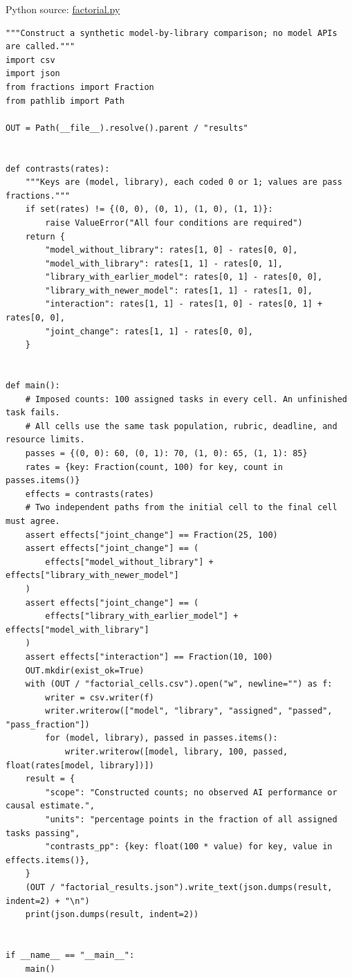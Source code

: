 \FloatBarrier
{}
Python source:
\href{../03_Data_and_Code/AI_Workflows/factorial.py}{factorial.py}

\begin{Verbatim}[breaklines,breakanywhere,fontsize=\small]
"""Construct a synthetic model-by-library comparison; no model APIs are called."""
import csv
import json
from fractions import Fraction
from pathlib import Path

OUT = Path(__file__).resolve().parent / "results"


def contrasts(rates):
    """Keys are (model, library), each coded 0 or 1; values are pass fractions."""
    if set(rates) != {(0, 0), (0, 1), (1, 0), (1, 1)}:
        raise ValueError("All four conditions are required")
    return {
        "model_without_library": rates[1, 0] - rates[0, 0],
        "model_with_library": rates[1, 1] - rates[0, 1],
        "library_with_earlier_model": rates[0, 1] - rates[0, 0],
        "library_with_newer_model": rates[1, 1] - rates[1, 0],
        "interaction": rates[1, 1] - rates[1, 0] - rates[0, 1] + rates[0, 0],
        "joint_change": rates[1, 1] - rates[0, 0],
    }


def main():
    # Imposed counts: 100 assigned tasks in every cell. An unfinished task fails.
    # All cells use the same task population, rubric, deadline, and resource limits.
    passes = {(0, 0): 60, (0, 1): 70, (1, 0): 65, (1, 1): 85}
    rates = {key: Fraction(count, 100) for key, count in passes.items()}
    effects = contrasts(rates)
    # Two independent paths from the initial cell to the final cell must agree.
    assert effects["joint_change"] == Fraction(25, 100)
    assert effects["joint_change"] == (
        effects["model_without_library"] + effects["library_with_newer_model"]
    )
    assert effects["joint_change"] == (
        effects["library_with_earlier_model"] + effects["model_with_library"]
    )
    assert effects["interaction"] == Fraction(10, 100)
    OUT.mkdir(exist_ok=True)
    with (OUT / "factorial_cells.csv").open("w", newline="") as f:
        writer = csv.writer(f)
        writer.writerow(["model", "library", "assigned", "passed", "pass_fraction"])
        for (model, library), passed in passes.items():
            writer.writerow([model, library, 100, passed, float(rates[model, library])])
    result = {
        "scope": "Constructed counts; no observed AI performance or causal estimate.",
        "units": "percentage points in the fraction of all assigned tasks passing",
        "contrasts_pp": {key: float(100 * value) for key, value in effects.items()},
    }
    (OUT / "factorial_results.json").write_text(json.dumps(result, indent=2) + "\n")
    print(json.dumps(result, indent=2))


if __name__ == "__main__":
    main()
\end{Verbatim}

